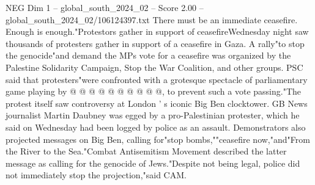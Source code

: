 \begin{textsample}{NEG Dim 1 – global\_south\_2024\_02 – Score 2.00 – global\_south\_2024\_02/106124397.txt}
There must be an immediate ceasefire.
Enough is enough."Protestors gather in support of ceasefireWednesday night saw thousands of protesters gather in support of a ceasefire in Gaza.
A rally"to stop the genocide"and demand the MPs vote for a ceasefire was organized by the Palestine Solidarity Campaign, Stop the War Coalition, and other groups.
PSC said that protesters"were confronted with a grotesque spectacle of parliamentary game playing by @ @ @ @ @ @ @ @ @ @, to prevent such a vote passing."The protest itself saw controversy at London ' s iconic Big Ben clocktower.
GB News journalist Martin Daubney was egged by a pro-Palestinian protester, which he said on Wednesday had been logged by police as an assault.
Demonstrators also projected messages on Big Ben, calling for"stop bombs,""ceasefire now,"and"From the River to the Sea."Combat Antisemitism Movement described the latter message as calling for the genocide of Jews."Despite not being legal, police did not immediately stop the projection,"said CAM.

\end{textsample}
